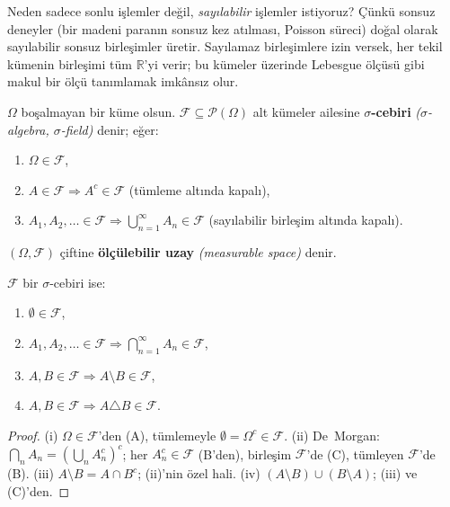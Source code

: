 \begin{tanimgerekce}
Neden sadece sonlu işlemler değil, \emph{sayılabilir} işlemler istiyoruz?
Çünkü sonsuz deneyler (bir madeni paranın sonsuz kez atılması, Poisson süreci)
doğal olarak sayılabilir sonsuz birleşimler üretir. Sayılamaz birleşimlere
izin versek, her tekil kümenin birleşimi tüm $\mathbb{R}$'yi verir; bu kümeler
üzerinde Lebesgue ölçüsü gibi makul bir ölçü tanımlamak imkânsız olur.
\end{tanimgerekce}

\begin{tanim}\label{def:sigmacebiri}
$\Omega$ boşalmayan bir küme olsun. $\mathcal{F} \subseteq \mathcal{P}(\Omega)$
alt kümeler ailesine \textbf{$\sigma$-cebiri} \emph{($\sigma$-algebra,
$\sigma$-field)} denir; eğer:
\begin{enumerate}[label=\textbf{(\Alph*)}]
  \item $\Omega \in \mathcal{F}$,
  \item $A \in \mathcal{F} \Rightarrow A^c \in \mathcal{F}$ \quad(tümleme altında kapalı),
  \item $A_1, A_2, \ldots \in \mathcal{F} \Rightarrow \bigcup_{n=1}^\infty A_n \in \mathcal{F}$
        \quad(sayılabilir birleşim altında kapalı).
\end{enumerate}
$(\Omega, \mathcal{F})$ çiftine \textbf{ölçülebilir uzay} \emph{(measurable space)} denir.
\end{tanim}

\begin{sonuc}\label{cor:sigmaturev}
$\mathcal{F}$ bir $\sigma$-cebiri ise:
\begin{enumerate}[label=(\roman*)]
  \item $\emptyset \in \mathcal{F}$,
  \item $A_1, A_2, \ldots \in \mathcal{F} \Rightarrow \bigcap_{n=1}^\infty A_n \in \mathcal{F}$,
  \item $A, B \in \mathcal{F} \Rightarrow A \setminus B \in \mathcal{F}$,
  \item $A, B \in \mathcal{F} \Rightarrow A \triangle B \in \mathcal{F}$.
\end{enumerate}
\end{sonuc}

\begin{proof}
(i) $\Omega \in \mathcal{F}$'den (A), tümlemeyle $\emptyset = \Omega^c \in \mathcal{F}$.
(ii) De~Morgan: $\bigcap_n A_n = \left(\bigcup_n A_n^c\right)^c$;
her $A_n^c \in \mathcal{F}$ (B'den), birleşim $\mathcal{F}$'de (C), tümleyen $\mathcal{F}$'de (B).
(iii) $A \setminus B = A \cap B^c$; (ii)'nin özel hali.
(iv) $(A \setminus B) \cup (B \setminus A)$; (iii) ve (C)'den.
\end{proof}

